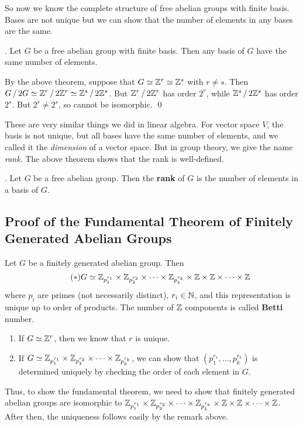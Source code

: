 So now we know the complete structure of free abelian groups with finite basis. Bases are not unique but we can show that the number of elements in any bases are the same.

\thm. Let \(G\) be a free abelian group with finite basis. Then any basis of \(G\) have the same number of elements.

\pf By the above theorem, suppose that \(G \simeq \mathbb{Z}^r \simeq \mathbb{Z}^s\) with \(r\neq s\). Then \(G \operatorname{/} 2G \simeq \mathbb{Z}^r \operatorname{/} 2\mathbb{Z}^r \simeq \mathbb{Z}^s \operatorname{/} 2\mathbb{Z}^s\). But \(\mathbb{Z}^r \operatorname{/} 2\mathbb{Z}^r\) has order \(2^r\), while \(\mathbb{Z}^s \operatorname{/} 2\mathbb{Z}^s\) has order \(2^s\). But \(2^r \neq 2^s\), so cannot be isomorphic. \qed

These are very similar things we did in linear algebra. For vector space \(V\), the basis is not unique, but all bases have the same number of elements, and we called it the \textit{dimension} of a vector space. But in group theory, we give the name \textit{rank}. The above theorem shows that the rank is well-defined.

.  Let \(G\) be a free abelian group. Then the \textbf{rank} of \(G\) is the number of elements in a basis of \(G\).

\subsection*{Proof of the Fundamental Theorem of Finitely Generated Abelian Groups}

\recall Let \(G\) be a finitely generated abelian group. Then
\[ \tag{\mast}
    G \simeq \Z_{p_1^{r_1}} \times \Z_{p_2^{r_2}} \times \cdots \times \Z_{p_k^{r_k}} \times \Z \times \Z \times \cdots \times \Z
\]
where \(p_i\) are primes (not necessarily distinct), \(r_i \in \mathbb{N}\), and this representation is unique up to order of products. The number of \(\mathbb{Z}\) components is called \textbf{Betti} number.

\rmk
\begin{enumerate}
    \item If \(G \simeq \mathbb{Z}^r\), then we know that \(r\) is unique.
    \item If \(G \simeq \mathbb{Z}_{p_1^{r_1}} \times \mathbb{Z}_{p_2^{r_2}} \times \cdots \times \mathbb{Z}_{p_k^{r_k}}\), we can show that \((p_1^{r_1}, \dots, p_k^{r_k})\) is determined uniquely by checking the order of each element in \(G\).
\end{enumerate}

Thus, to show the fundamental theorem, we need to show that finitely generated abelian groups are isomorphic to \(\mathbb{Z}_{p_1^{r_1}} \times \mathbb{Z}_{p_2^{r_2}} \times \cdots \times \mathbb{Z}_{p_k^{r_k}} \times \mathbb{Z} \times \mathbb{Z} \times \cdots \times \mathbb{Z}\). After then, the uniqueness follows easily by the remark above.

